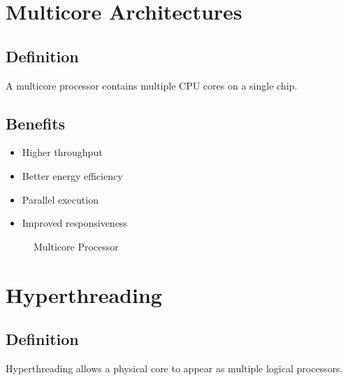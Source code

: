 \section{Multicore Architectures}

\subsection{Definition}

A multicore processor contains multiple CPU cores on a single chip.

\subsection{Benefits}

\begin{itemize}
\item Higher throughput
\item Better energy efficiency
\item Parallel execution
\item Improved responsiveness
\end{itemize}

\begin{figure}[h]
\centering
{}
\caption{Multicore Processor}
\end{figure}

\section{Hyperthreading}

\subsection{Definition}

Hyperthreading allows a physical core to appear as multiple logical processors.

